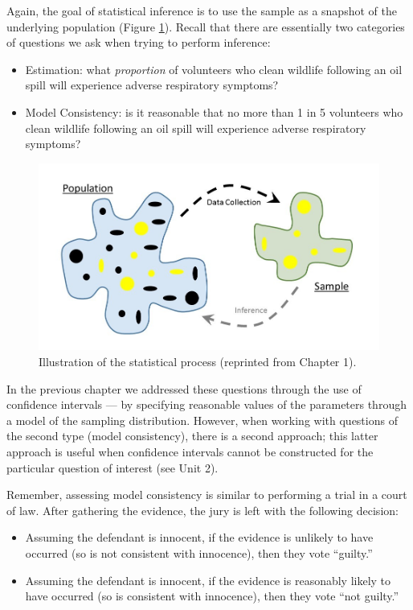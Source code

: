 \documentclass[]{book}
\providecommand{\tightlist}{%
  \setlength{\itemsep}{0pt}\setlength{\parskip}{0pt}}
\theoremstyle{definition}
\theoremstyle{definition}
\theoremstyle{remark}
\begin{document}
Again, the goal of statistical inference is to use the sample as a
snapshot of the underlying population (Figure
\ref{fig:nulldistns-statistical-process}). Recall that there are
essentially two categories of questions we ask when trying to perform
inference:

\begin{itemize}
\tightlist
\item
  Estimation: what \emph{proportion} of volunteers who clean wildlife
  following an oil spill will experience adverse respiratory symptoms?
\item
  Model Consistency: is it reasonable that no more than 1 in 5
  volunteers who clean wildlife following an oil spill will experience
  adverse respiratory symptoms?
\end{itemize}

\begin{figure}

{\centering \includegraphics[width=0.8\linewidth]{images/Basics-Stat-Process} 

}

\caption{Illustration of the statistical process (reprinted from Chapter 1).}\label{fig:nulldistns-statistical-process}
\end{figure}

In the previous chapter we addressed these questions through the use of
confidence intervals --- by specifying reasonable values of the
parameters through a model of the sampling distribution. However, when
working with questions of the second type (model consistency), there is
a second approach; this latter approach is useful when confidence
intervals cannot be constructed for the particular question of interest
(see Unit 2).

Remember, assessing model consistency is similar to performing a trial
in a court of law. After gathering the evidence, the jury is left with
the following decision:

\begin{itemize}
\tightlist
\item
  Assuming the defendant is innocent, if the evidence is unlikely to
  have occurred (so is not consistent with innocence), then they vote
  ``guilty.''
\item
  Assuming the defendant is innocent, if the evidence is reasonably
  likely to have occurred (so is consistent with innocence), then they
  vote ``not guilty.''
\end{itemize}
\end{document}
